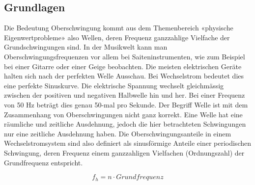\subsection{Grundlagen}
Die Bedeutung Oberschwingung kommt aus dem Themenbereich «physische Eigenwertprobleme» also Wellen, deren Frequenz ganzzahlige Vielfache der Grundschwingungen sind. In der Musikwelt kann man Oberschwingungsfrequenzen vor allem bei Saiteninstrumenten, wie zum Beispiel bei einer Gitarre oder einer Geige beobachten. Die meisten elektrischen Geräte halten sich nach der perfekten Welle Ausschau. Bei Wechselstrom bedeutet dies eine perfekte Sinuskurve. Die elektrische Spannung wechselt gleichmässig zwischen der positiven und negativen Halbwelle hin und her. Bei einer Frequenz von 50 Hz beträgt dies genau 50-mal pro Sekunde. Der Begriff Welle ist mit dem Zusammenhang von Oberschwingungen nicht ganz korrekt. Eine Welle hat eine räumliche und zeitliche Ausdehnung, jedoch die hier betrachteten Schwingungen nur eine zeitliche Ausdehnung haben. Die Oberschwingungsanteile in einem Wechselstromsystem sind also definiert als sinusförmige Anteile einer periodischen Schwingung, deren Frequenz einem ganzzahligen Vielfachen (Ordnungszahl) der Grundfrequenz entspricht.

\begin{equation}
f_h = n \cdot Grundfrequenz
\end{equation}

